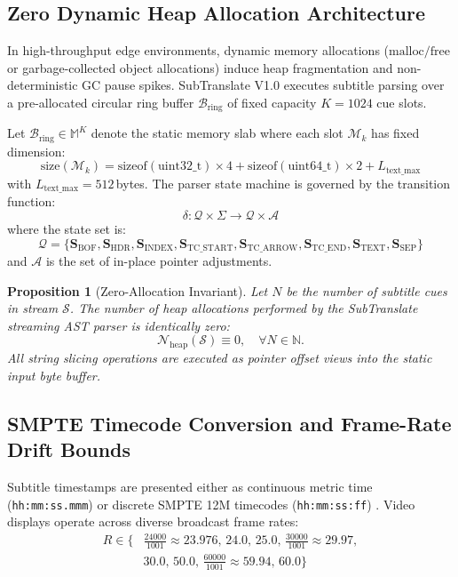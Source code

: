 \documentclass[11pt,a4paper,reqno]{article}
\newtheorem{proposition}[theorem]{Proposition}
\theoremstyle{definition}
\theoremstyle{remark}
\begin{document}
\subsection{Zero Dynamic Heap Allocation Architecture}
In high-throughput edge environments, dynamic memory allocations ($\text{malloc} / \text{free}$ or garbage-collected object allocations) induce heap fragmentation and non-deterministic GC pause spikes. SubTranslate V1.0 executes subtitle parsing over a pre-allocated circular ring buffer $\mathcal{B}_{\text{ring}}$ of fixed capacity $K = 1024$ cue slots.

Let $\mathcal{B}_{\text{ring}} \in \mathbb{M}^{K}$ denote the static memory slab where each slot $\mathcal{M}_k$ has fixed dimension:
\begin{equation}
\mathrm{size}(\mathcal{M}_k) = \mathrm{sizeof}(\text{uint32\_t}) \times 4 + \mathrm{sizeof}(\text{uint64\_t}) \times 2 + L_{\text{text\_max}}
\end{equation}
with $L_{\text{text\_max}} = 512$\,bytes. The parser state machine is governed by the transition function:
\begin{equation}
\delta: \mathcal{Q} \times \Sigma \to \mathcal{Q} \times \mathcal{A}
\end{equation}
where the state set is:
\begin{equation}
\mathcal{Q} = \{\mathbf{S}_{\text{BOF}}, \mathbf{S}_{\text{HDR}}, \mathbf{S}_{\text{INDEX}}, \mathbf{S}_{\text{TC\_START}}, \mathbf{S}_{\text{TC\_ARROW}}, \mathbf{S}_{\text{TC\_END}}, \mathbf{S}_{\text{TEXT}}, \mathbf{S}_{\text{SEP}}\}
\end{equation}
and $\mathcal{A}$ is the set of in-place pointer adjustments. 

\begin{proposition}[Zero-Allocation Invariant]
Let $N$ be the number of subtitle cues in stream $\mathcal{S}$. The number of heap allocations performed by the SubTranslate streaming AST parser is identically zero:
\begin{equation}
\mathcal{N}_{\mathrm{heap}}(\mathcal{S}) \equiv 0, \quad \forall N \in \mathbb{N}.
\end{equation}
All string slicing operations are executed as pointer offset views into the static input byte buffer.
\end{proposition}

\subsection{SMPTE Timecode Conversion and Frame-Rate Drift Bounds}
Subtitle timestamps are presented either as continuous metric time (\texttt{hh:mm:ss.mmm}) or discrete SMPTE 12M timecodes (\texttt{hh:mm:ss:ff}) \cite{smpte_12m}. Video displays operate across diverse broadcast frame rates:
\begin{equation}
\begin{aligned}
R \in \biggl\{ &\frac{24000}{1001} \approx 23.976,\, 24.0,\, 25.0,\, \frac{30000}{1001} \approx 29.97,\\
&30.0,\, 50.0,\, \frac{60000}{1001} \approx 59.94,\, 60.0 \biggr\}
\end{aligned}
\end{equation}
\end{document}
